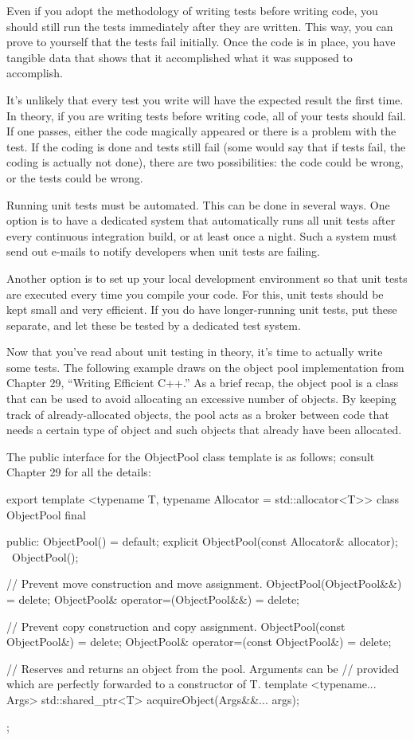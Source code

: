Even if you adopt the methodology of writing tests before writing code, you should still run the tests immediately after they are written. This way, you can prove to yourself that the tests fail initially. Once the code is in place, you have tangible data that shows that it accomplished what it was supposed to accomplish.

It’s unlikely that every test you write will have the expected result the first time. In theory, if you are writing tests before writing code, all of your tests should fail. If one passes, either the code magically appeared or there is a problem with the test. If the coding is done and tests still fail (some would say that if tests fail, the coding is actually not done), there are two possibilities: the code could be wrong, or the tests could be wrong.

Running unit tests must be automated. This can be done in several ways. One option is to have a dedicated system that automatically runs all unit tests after every continuous integration build, or at least once a night. Such a system must send out e-mails to notify developers when unit tests are failing.

Another option is to set up your local development environment so that unit tests are executed every time you compile your code. For this, unit tests should be kept small and very efficient. If you do have longer-running unit tests, put these separate, and let these be tested by a dedicated test system.


Now that you’ve read about unit testing in theory, it’s time to actually write some tests. The following example draws on the object pool implementation from Chapter 29, “Writing Efficient C++.” As a brief recap, the object pool is a class that can be used to avoid allocating an excessive number of objects. By keeping track of already-allocated objects, the pool acts as a broker between code that needs a certain type of object and such objects that already have been allocated.

The public interface for the ObjectPool class template is as follows; consult Chapter 29 for all the details:

\begin{cpp}
export
template <typename T, typename Allocator = std::allocator<T>>
class ObjectPool final
{
    public:
        ObjectPool() = default;
        explicit ObjectPool(const Allocator& allocator);
        ~ObjectPool();

        // Prevent move construction and move assignment.
        ObjectPool(ObjectPool&&) = delete;
        ObjectPool& operator=(ObjectPool&&) = delete;

        // Prevent copy construction and copy assignment.
        ObjectPool(const ObjectPool&) = delete;
        ObjectPool& operator=(const ObjectPool&) = delete;

        // Reserves and returns an object from the pool. Arguments can be
        // provided which are perfectly forwarded to a constructor of T.
        template <typename... Args>
        std::shared_ptr<T> acquireObject(Args&&... args);
};
\end{cpp}

